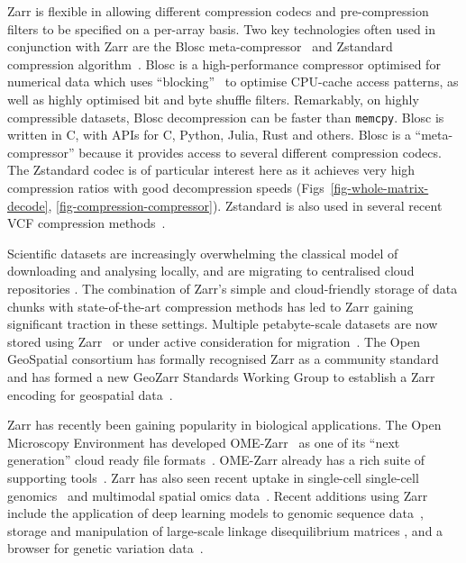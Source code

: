 \documentclass[a4paper,num-refs]{oup-contemporary}
\begin{document}
Zarr is flexible in allowing different compression codecs and 
pre-compression filters to be specified on a per-array basis.
Two key technologies often used in conjunction with Zarr are the Blosc
meta-compressor~\cite{alted2010modern}
and Zstandard compression algorithm~\citep{collet2021rfc}.
Blosc is a high-performance compressor optimised for numerical
data which uses ``blocking''~\citep{alted2010modern} to 
optimise CPU-cache access patterns, as well as highly optimised
bit and byte shuffle filters.  Remarkably, on highly 
compressible datasets, Blosc decompression can be faster 
than \texttt{memcpy}.
Blosc is written in C, with APIs for C, Python, Julia, Rust
and others.
Blosc is a ``meta-compressor'' because it provides 
access to several different compression codecs. The 
Zstandard codec is of particular 
interest here as it achieves very high compression ratios
with good decompression speeds (Figs~\ref{fig-whole-matrix-decode},
\ref{fig-compression-compressor}).
Zstandard is also used in several recent VCF compression 
methods~\citep[e.g.][]{lefaive2021sparse,wertenbroek2022xsi}.

Scientific datasets are increasingly overwhelming the classical
model of downloading and analysing locally, and are migrating to 
centralised cloud repositories \citep{abernathey2021cloud,moore2021ome}.
The combination of Zarr's simple and cloud-friendly storage 
of data chunks with state-of-the-art compression methods has 
led to Zarr gaining significant traction in these settings.
Multiple petabyte-scale datasets are now stored using 
Zarr~\cite[e.g.][]{gowan2022using, %
fahnestock2023mappin, %
cmip6_dataset}
or under active consideration for migration~\citep{durbin2020task,abernathey2021opening}.
The Open GeoSpatial consortium has formally recognised Zarr as a community
standard~\cite{ogc_zarr2_standard}
and has formed
a new GeoZarr Standards Working Group to establish a Zarr encoding for
geospatial data~\cite{ogc_geozarr_news}.

Zarr has recently been gaining popularity in biological applications.
The Open Microscopy Environment has developed OME-Zarr~\cite{moore2023ome} as one 
of its ``next generation'' cloud ready file formats~\citep{moore2021ome}.
OME-Zarr already has a rich suite of supporting
tools~\cite{moore2023ome,rzepka2023toward}. 
Zarr has also seen recent uptake 
in single-cell single-cell genomics~\citep{dhapola2022scarf,virshup2023scverse}
and multimodal spatial omics
data~\citep{marconato2024spatialdata,baker2023emobject}.
Recent additions using Zarr include the application of deep learning
models to genomic sequence data~\citep{klie2023predictive}, storage and 
manipulation of large-scale linkage disequilibrium matrices \cite{zabad2023fast},  
and a browser for genetic variation data~\citep{konig2023divbrowse}.
\end{document}
